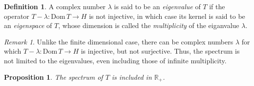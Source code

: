 \documentclass{jams-l}
\newtheorem{proposition}[theorem]{Proposition}
\theoremstyle{definition}
\newtheorem{definition}[theorem]{Definition}
\theoremstyle{remark}
\newtheorem{remark}[theorem]{Remark}
\numberwithin{equation}{section}
\begin{document}
        \begin{definition}
        
            A complex number $\lambda$ is said to be an \textit{eigenvalue} of $T$ if the operator $T - \lambda : \mathrm{Dom} \, T \longrightarrow H$ is not injective, in which case its kernel is said to be an \textit{eigenspace} of $T$, whose dimension is called the \textit{multiplicity} of the eiganvalue $\lambda$.
        
        \end{definition}
        
        \begin{remark}
        
            Unlike the finite dimensional case, there can be complex numbers $\lambda$ for which $T - \lambda : \mathrm{Dom} \, T \longrightarrow H$ is injective, but not surjective. Thus, the spectrum is not limited to the eigenvalues, even including those of infinite multiplicity.
        
        \end{remark}
        
        \begin{proposition}
        
            The spectrum of $T$ is included in $\mathbb{R}_+$.
        
        \end{proposition}
        
\end{document}
